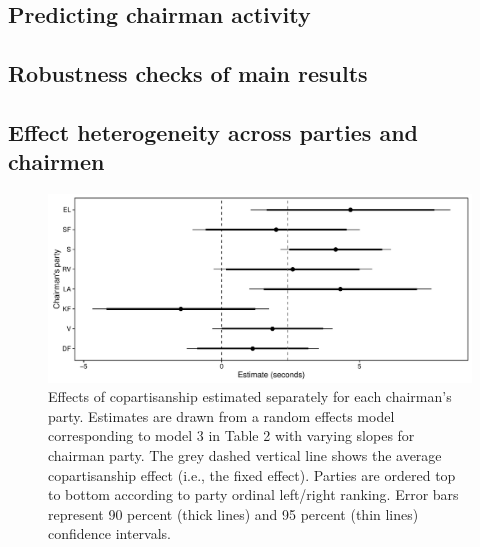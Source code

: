 \documentclass[12pt,a4paper]{article}
\begin{document}

\subsection{Predicting chairman activity}\label{appact}



\clearpage
\subsection{Robustness checks of main results}\label{approbust}







\clearpage
\subsection{Effect heterogeneity across parties and chairmen}\label{appchairranef}

\begin{figure}[!h]
\centering
\includegraphics[scale=.55]{../figures/parlbias_partyranefs.pdf}
\caption{Effects of copartisanship estimated separately for each chairman's party. Estimates are drawn from a random effects model corresponding to model 3 in Table 2 with varying slopes for chairman party. The grey dashed vertical line shows the average copartisanship effect (i.e., the fixed effect). Parties are ordered top to bottom according to party ordinal left/right ranking. Error bars represent 90 percent (thick lines) and 95 percent (thin lines) confidence intervals.}\label{partyranefs}
\end{figure}
\end{document}
